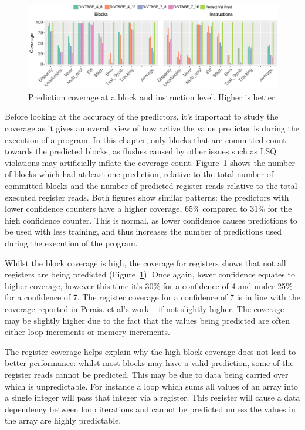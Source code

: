 \begin{figure}[t]
    \centering
    \includegraphics[width=1\textwidth]{chapter3/graphics/coverageFull.pdf}
    \caption{Prediction coverage at a block and instruction level. Higher is better}
    \label{fig:vtag_cov_block}
	\vspace{1em}
\end{figure}

Before looking at the accuracy of the predictors, it's important to study the coverage as it gives an overall view of how active the value predictor is during the execution of a program.
In this chapter, only blocks that are committed count towards the predicted blocks, as flushes caused by other issues such as LSQ violations may artificially inflate the coverage count.
Figure~\ref{fig:vtag_cov_block} shows the number of blocks which had at least one prediction, relative to the total number of committed blocks and the number of predicted register reads relative to the total executed register reads.
Both figures show similar patterns: the predictors with lower confidence counters have a higher coverage, 65\% compared to 31\% for the high confidence counter.
This is normal, as lower confidence causes predictions to be used with less training, and thus increases the number of predictions used during the execution of the program.

Whilst the block coverage is high, the coverage for registers shows that not all registers are being predicted (Figure~\ref{fig:vtag_cov_block}).
Once again, lower confidence equates to higher coverage, however this time it's 30\% for a confidence of 4 and under 25\% for a confidence of 7.
The register coverage for a confidence of 7 is in line with the coverage reported in Perais. et al's work ~\cite{peraisBeBop2015, peraisVTAGE2014} if not slightly higher.
The coverage may be slightly higher due to the fact that the values being predicted are often either loop increments or memory increments.

The register coverage helps explain why the high block coverage does not lead to better performance: whilst most blocks may have a valid prediction, some of the register reads cannot be predicted.
This may be due to data being carried over which is unpredictable.
For instance a loop which sums all values of an array into a single integer will pass that integer via a register.
This register will cause a data dependency between loop iterations and cannot be predicted unless the values in the array are highly predictable.

